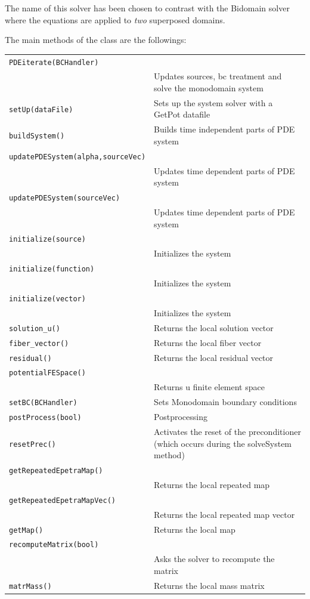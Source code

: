 \documentclass[11pt]{article}
\begin{document}
The name of this solver has been chosen to contrast with the Bidomain solver where the equations are applied to \emph{two} superposed domains.

The main methods of the class are the followings:
\begin{center}
\begin{longtable}{p{3cm}p{8cm}}
	\hline
	\texttt{PDEiterate(BCHandler)} \\
	& Updates sources, bc treatment and solve the monodomain system\\
	\texttt{setUp(dataFile)} & Sets up the system solver with a GetPot datafile\\
	\texttt{buildSystem()} & Builds time independent parts of PDE system\\
	\texttt{updatePDESystem(alpha,sourceVec)} \\
	& Updates time dependent parts of PDE system\\
	\texttt{updatePDESystem(sourceVec)} \\
	& Updates time dependent parts of PDE system\\
	\texttt{initialize(source)} \\
	& Initializes the system\\
	\texttt{initialize(function)} \\
	& Initializes the system\\
	\texttt{initialize(vector)} \\
	& Initializes the system\\
	\texttt{solution\_u()} & Returns the local solution vector\\
	\texttt{fiber\_vector()} & Returns the local fiber vector\\
	\texttt{residual()} & Returns the local residual vector\\
	\texttt{potentialFESpace()} \\
	& Returns u finite element space\\
	\texttt{setBC(BCHandler)} & Sets Monodomain boundary conditions\\
	\texttt{postProcess(bool)} & Postprocessing\\
	\texttt{resetPrec()} & Activates the reset of the preconditioner (which occurs during the solveSystem method)\\
	\texttt{getRepeatedEpetraMap()} \\
	& Returns the local repeated map\\
	\texttt{getRepeatedEpetraMapVec()}\\
	 & Returns the local repeated map vector\\
	\texttt{getMap()} & Returns the local map\\
	\texttt{recomputeMatrix(bool)} \\
	& Asks the solver to recompute the matrix\\
	\texttt{matrMass()} & Returns the local mass matrix\\
	\hline
\end{longtable}
\end{center}
\end{document}
